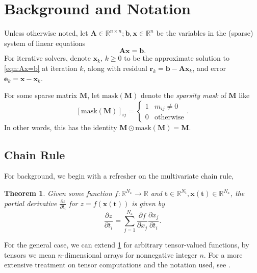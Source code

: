 \documentclass{article}
\newcommand{\mat}[1]{\bm{{#1}}}
\renewcommand{\vec}[1]{\bm{{#1}}}
\newcommand{\mask}[1]{\text{mask}\left( {#1} \right)}
\newtheorem{theorem}{Theorem}[section]
\theoremstyle{definition}
\begin{document}
\section{Background and Notation}
Unless otherwise noted, let $\mat{A} \in \mathbb{R}^{n \times n}; \vec{b}, \vec{x} \in \mathbb{R}^n$ be the variables in the (sparse) system of linear equations
\begin{equation}
  \mat{A}\vec{x} = \vec{b}. \label{eqn:Ax=b}
\end{equation}
For iterative solvers, denote $\vec{x}_k$, $k \geq 0$ to be the approximate solution to \cref{eqn:Ax=b} at iteration $k$, along with residual $\vec{r}_k = \vec{b} - \mat{A}\vec{x}_k$, and error $\vec{e}_k = \vec{x} - \vec{x}_k$.

For some sparse matrix $\mat{M}$, let $\mask{\mat{M}}$ denote the \textit{sparsity mask} of $\mat{M}$ like
\begin{equation}
  \left[\mask{\mat{M}}\right]_{ij} = \begin{cases}
    1 & m_{ij} \neq 0 \\
    0 & \text{otherwise}
    \end{cases}.
\end{equation}
In other words, this has the identity $\mat{M} \odot \mask{\mat{M}} = \mat{M}$.

\subsection{Chain Rule}
For background, we begin with a refresher on the multivariate chain rule\cite{Johnson_notes},
\begin{theorem}
  Given some function $f : \mathbb{R}^{N_x} \to \mathbb{R}$ and $\vec{t} \in \mathbb{R}^{N_t}, \vec{x}\left(\vec{t}\right) \in \mathbb{R}^{N_x}$, the partial derivative $\frac{\partial z}{\partial t_i}$ for $z=f(\vec{x}\left(\vec{t}\right))$ is given by
  \begin{equation}
    \frac{\partial z}{\partial t_i} = \sum_{j=1}^{N_x} \frac{\partial f}{\partial x_j} \frac{\partial x_j}{\partial t_i}. \label{eqn:chainrule}
  \end{equation}
  \label{thm:chainrule}
\end{theorem}

For the general case, we can extend \cref{thm:chainrule} for arbitrary tensor-valued functions, by tensors we mean $n$-dimensional arrays for nonnegative integer $n$.  For a more extensive treatment on tensor computations and the notation used, see \cite{tensors}.
\end{document}
